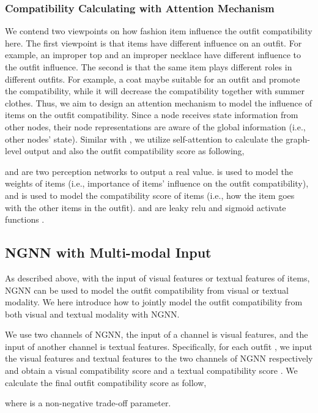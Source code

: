 \documentclass[sigconf]{acmart}
\begin{document}
\subsubsection{Compatibility Calculating with Attention Mechanism}
We contend two viewpoints on how fashion item influence the outfit compatibility here.
The first viewpoint is that items have different influence on an outfit. For example, an improper top and an improper necklace have different influence to the outfit influence.
The second is that the same item plays different roles in different outfits. For example, a coat maybe suitable for an outfit and promote the compatibility, while it will decrease the compatibility together with summer clothes.
Thus, we aim to design an attention mechanism to model the influence of items on the outfit compatibility.
Since a node receives state information from other nodes, their node representations are aware of the global information (i.e., other nodes' state). Similar with \cite{li2015gated}, we utilize self-attention  \cite{Tan2017Deep,vaswani2017attention} to calculate the graph-level output and also the outfit compatibility score as following,

 and  are two perception networks to output a real value.
 is used to model the weights of items (i.e., importance of items' influence on the outfit compatibility), and  is used to model the compatibility score of items (i.e., how the item goes with the other items in the outfit).
 and  are leaky relu and sigmoid activate functions .

\subsection{NGNN with Multi-modal Input} \label{sect:multi}
As described above, with the input of visual features or textual features of items, NGNN can be used to model the outfit compatibility from visual or textual modality. We here introduce how to jointly model the outfit compatibility from both visual and textual modality with NGNN.


 We use two channels of NGNN, the input of a channel is visual features, and the input of another channel is textual features.
 Specifically, for each outfit , we input the visual features and textual features to the two channels of NGNN respectively and obtain a visual compatibility score  and a textual compatibility score . We calculate the final outfit compatibility score  as follow,

where  is a non-negative trade-off parameter.
\end{document}
